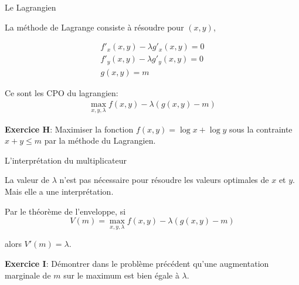 \documentclass[handout]{beamer}
\begin{document}
\begin{frame}{Le Lagrangien}

La méthode de Lagrange consiste à résoudre pour $(x,y)$, 

\begin{eqnarray}
f'_x(x,y) -  \lambda g'_x(x,y) = 0 \\
f'_y(x,y) -  \lambda g'_y(x,y) = 0 \\
g(x,y) = m
\end{eqnarray} 

Ce sont les CPO du lagrangien: 
\begin{eqnarray}
	\max_{x,y,\lambda} f(x,y) - \lambda (g(x,y)-m)
\end{eqnarray} 

\textbf{Exercice H}: Maximiser la fonction $f(x,y) = \log x + \log y$ sous la contrainte $x+y \le m$ par la méthode du Lagrangien.
\end{frame}

\begin{frame}{L'interprétation du multiplicateur}

La valeur de $\lambda$ n'est pas nécessaire pour résoudre les valeurs optimales de $x$ et $y$. Mais elle a une  interprétation.

Par le théorème de l'enveloppe, si $$V(m) = \max_{x,y,\lambda} f(x,y) - \lambda (g(x,y)-m)$$

alors $V'(m) = \lambda$. 
\vspace{0.5in}

\textbf{Exercice I}: Démontrer dans le problème précédent qu'une augmentation marginale de $m$ sur le maximum est bien égale à $\lambda$. 
\end{frame}
\end{document}
